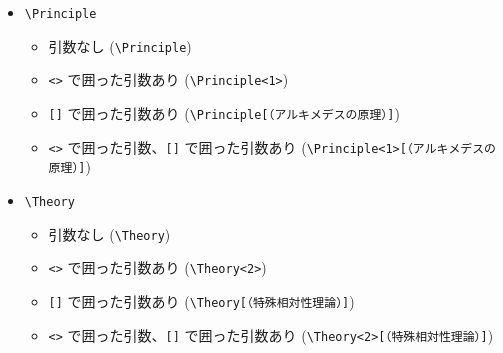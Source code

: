 \documentclass[oneside,10pt,a4paper]{jsarticle}
\begin{document}
  \begin{itemize}
    \item \verb|\Principle|
      \begin{itemize}
        \item 引数なし (\verb|\Principle|)
          \begin{quote}
            \Principle
          \end{quote}
        \item \verb|<>| で囲った引数あり (\verb|\Principle<1>|)
          \begin{quote}
          \end{quote}
        \item \verb|[]| で囲った引数あり (\verb|\Principle[（アルキメデスの原理）]|)
          \begin{quote}
            \Principle[（アルキメデスの原理）]
          \end{quote}
        \item \verb|<>| で囲った引数、\verb|[]| で囲った引数あり (\verb|\Principle<1>[（アルキメデスの原理）]|)
          \begin{quote}
          \end{quote}
      \end{itemize}
    \item \verb|\Theory|
      \begin{itemize}
        \item 引数なし (\verb|\Theory|)
          \begin{quote}
            \Theory
          \end{quote}
        \item \verb|<>| で囲った引数あり (\verb|\Theory<2>|)
          \begin{quote}
          \end{quote}
        \item \verb|[]| で囲った引数あり (\verb|\Theory[（特殊相対性理論）]|)
          \begin{quote}
            \Theory[（特殊相対性理論）]
          \end{quote}
        \item \verb|<>| で囲った引数、\verb|[]| で囲った引数あり (\verb|\Theory<2>[（特殊相対性理論）]|)
          \begin{quote}
          \end{quote}
      \end{itemize}

\end{itemize}
\end{document}
